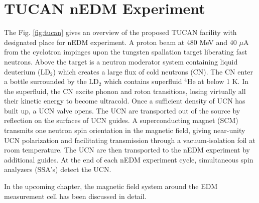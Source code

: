 \section{TUCAN nEDM Experiment}


The Fig. \ref{fig:tucan} gives an overview of the proposed TUCAN facility with designated place for nEDM experiment. A proton beam at 480 MeV and 40 $\mu$A from the cyclotron impinges upon the tungsten spallation target liberating fast neutrons. Above the target is a neutron moderator system containing liquid deuterium ($\mathrm{LD_2}$) which creates a large flux of cold neutrons (CN). The CN enter a bottle surrounded by the $\mathrm{LD_2}$ which contains superfluid $^4\mathrm{He}$ at below 1 K. In the superfluid, the CN excite phonon and roton transitions, losing virtually all their kinetic energy to become ultracold. Once a sufficient density of UCN has built up, a UCN valve opens. The UCN are transported out of the source by reflection on the surfaces of UCN guides. A superconducting magnet (SCM) transmits one neutron spin orientation in the magnetic field, giving near-unity UCN polarization and facilitating transmission through a vacuum-isolation foil at room temperature. The UCN are then transported to the nEDM experiment by additional guides. At the end of each nEDM experiment cycle, simultaneous spin analyzers (SSA's) detect the UCN.




In the upcoming chapter, the magnetic field system around the EDM measurement cell has been discussed in detail.








